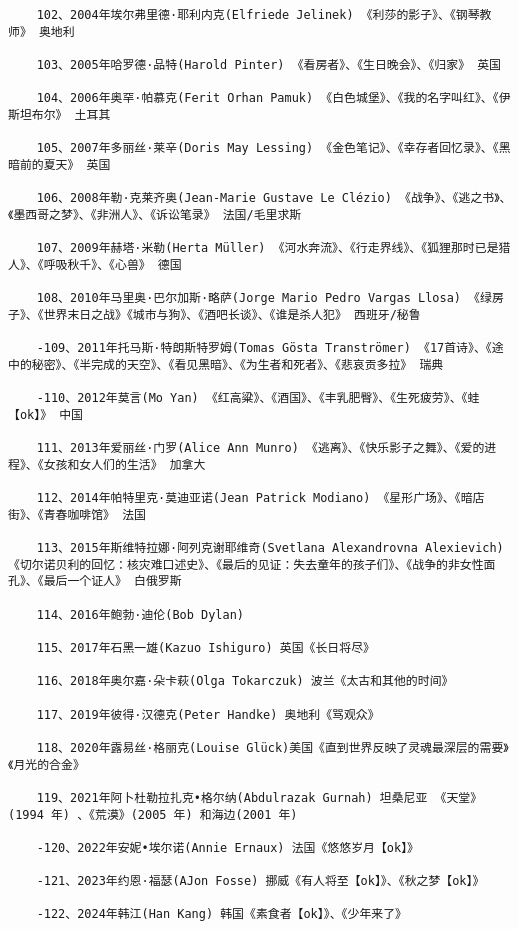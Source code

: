 \documentclass[UTF8]{../../RepresentationUniverse}
\begin{document}
\begin{lstlisting}
    102、2004年埃尔弗里德·耶利内克(Elfriede Jelinek) 《利莎的影子》、《钢琴教师》 奥地利
    
    103、2005年哈罗德·品特(Harold Pinter) 《看房者》、《生日晚会》、《归家》 英国
    
    104、2006年奥罕·帕慕克(Ferit Orhan Pamuk) 《白色城堡》、《我的名字叫红》、《伊斯坦布尔》 土耳其
    
    105、2007年多丽丝·莱辛(Doris May Lessing) 《金色笔记》、《幸存者回忆录》、《黑暗前的夏天》 英国
    
    106、2008年勒·克莱齐奥(Jean-Marie Gustave Le Clézio) 《战争》、《逃之书》、《墨西哥之梦》、《非洲人》、《诉讼笔录》 法国/毛里求斯
    
    107、2009年赫塔·米勒(Herta Müller) 《河水奔流》、《行走界线》、《狐狸那时已是猎人》、《呼吸秋千》、《心兽》 德国
    
    108、2010年马里奥·巴尔加斯·略萨(Jorge Mario Pedro Vargas Llosa) 《绿房子》、《世界末日之战》《城市与狗》、《酒吧长谈》、《谁是杀人犯》 西班牙/秘鲁
    
    -109、2011年托马斯·特朗斯特罗姆(Tomas Gösta Tranströmer) 《17首诗》、《途中的秘密》、《半完成的天空》、《看见黑暗》、《为生者和死者》、《悲哀贡多拉》 瑞典
    
    -110、2012年莫言(Mo Yan) 《红高粱》、《酒国》、《丰乳肥臀》、《生死疲劳》、《蛙【ok】》 中国
    
    111、2013年爱丽丝·门罗(Alice Ann Munro) 《逃离》、《快乐影子之舞》、《爱的进程》、《女孩和女人们的生活》 加拿大
    
    112、2014年帕特里克·莫迪亚诺(Jean Patrick Modiano) 《星形广场》、《暗店街》、《青春咖啡馆》 法国
    
    113、2015年斯维特拉娜·阿列克谢耶维奇(Svetlana Alexandrovna Alexievich) 《切尔诺贝利的回忆：核灾难口述史》、《最后的见证：失去童年的孩子们》、《战争的非女性面孔》、《最后一个证人》 白俄罗斯
    
    114、2016年鲍勃·迪伦(Bob Dylan) 
    
    115、2017年石黑一雄(Kazuo Ishiguro) 英国《长日将尽》
    
    116、2018年奥尔嘉·朵卡萩(Olga Tokarczuk) 波兰《太古和其他的时间》
    
    117、2019年彼得·汉德克(Peter Handke) 奥地利《骂观众》
    
    118、2020年露易丝·格丽克(Louise Glück)美国《直到世界反映了灵魂最深层的需要》《月光的合金》
    
    119、2021年阿卜杜勒拉扎克•格尔纳(Abdulrazak Gurnah) 坦桑尼亚 《天堂》(1994 年) 、《荒漠》(2005 年) 和海边(2001 年) 

    -120、2022年安妮•埃尔诺(Annie Ernaux) 法国《悠悠岁月【ok】》

    -121、2023年约恩·福瑟(AJon Fosse) 挪威《有人将至【ok】》、《秋之梦【ok】》

    -122、2024年韩江(Han Kang) 韩国《素食者【ok】》、《少年来了》
\end{lstlisting}
\end{document}
